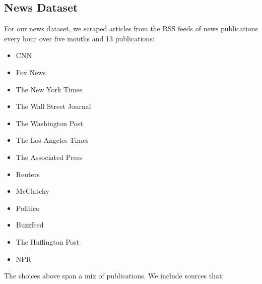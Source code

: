 \documentclass[letterpaper]{article}
\begin{document}

\subsection{News Dataset}

 For our news dataset, we scraped articles from the RSS feeds of news publications every hour over five months and 13 publications:
\begin{multicols}{2}
\begin{itemize}

\item CNN
\item Fox News
\item The New York Times
\item The Wall Street Journal
\item The Washington Post
\item The Los Angeles Times 
\item The Associated Press
\item Reuters
\item McClatchy 
\item Politico 
\item Buzzfeed
\item The Huffington Post
\item NPR 
\end{itemize}
\end{multicols}

The choices above span a mix of publications. We include sources that: 
\end{document}
